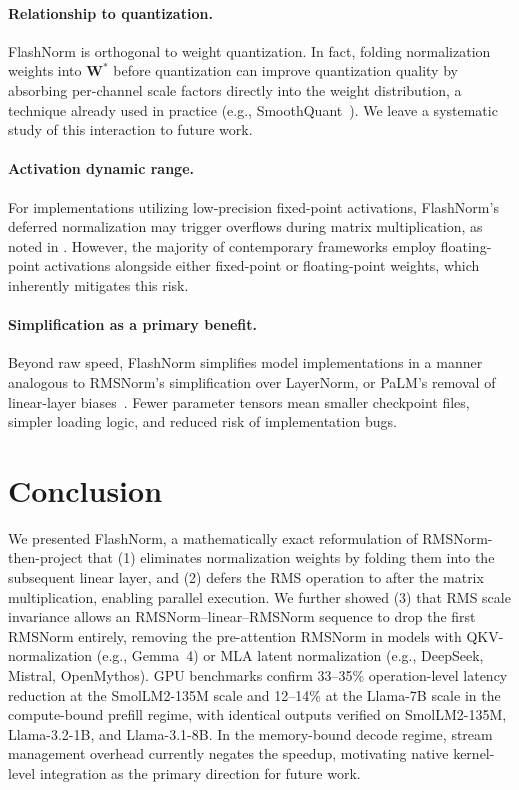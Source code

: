 \documentclass{article}
\begin{document}
\paragraph{Relationship to quantization.}
FlashNorm is orthogonal to weight quantization. In fact, folding normalization
weights into $\mathbf{W}^*$ before quantization can improve quantization quality
by absorbing per-channel scale factors directly into the weight distribution,
a technique already used in practice (e.g., SmoothQuant~\citep{smoothQuant}). We leave a systematic
study of this interaction to future work.

\paragraph{Activation dynamic range.}
For implementations utilizing low-precision fixed-point activations, FlashNorm's deferred
normalization may trigger overflows during matrix multiplication, as noted in \citep{MXNorm}.
However, the majority of contemporary frameworks employ floating-point activations alongside
either fixed-point or floating-point weights, which inherently mitigates this risk.

\paragraph{Simplification as a primary benefit.}
Beyond raw speed, FlashNorm simplifies model implementations in a manner analogous
to RMSNorm's simplification over LayerNorm, or PaLM's removal of linear-layer
biases~\citep{PaLM}. Fewer parameter tensors mean smaller checkpoint
files, simpler loading logic, and reduced risk of implementation bugs.

\section{Conclusion}
We presented FlashNorm, a mathematically exact reformulation of RMSNorm-then-project
that (1) eliminates normalization weights by folding them into the subsequent linear
layer, and (2) defers the RMS operation to after the matrix multiplication,
enabling parallel execution.
We further showed (3) that RMS scale invariance allows an RMSNorm--linear--RMSNorm sequence
to drop the first RMSNorm entirely, removing the pre-attention RMSNorm in models
with QKV-normalization (e.g., Gemma~4) or MLA latent normalization (e.g., DeepSeek, Mistral, OpenMythos).
GPU benchmarks confirm 33--35\% operation-level latency reduction at
the SmolLM2-135M scale and 12--14\% at the Llama-7B scale
in the compute-bound prefill regime, with identical outputs verified on
SmolLM2-135M, Llama-3.2-1B, and Llama-3.1-8B.
In the memory-bound decode regime, stream management overhead
currently negates the speedup, motivating native kernel-level integration as the
primary direction for future work.
\end{document}
